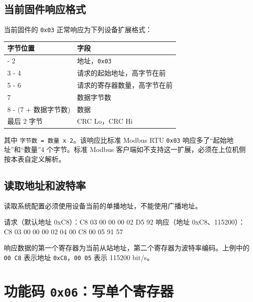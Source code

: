 \documentclass[
  chinese,
]{ctexart}
\newenvironment{Shaded}{}{}
\newcommand{\NormalTok}[1]{#1}
\newcounter{none} %
\begin{document}
\subsection{当前固件响应格式}\label{ux5f53ux524dux56faux4ef6ux54cdux5e94ux683cux5f0f}

当前固件的 \texttt{0x03} 正常响应为下列设备扩展格式：

{\def\LTcaptype{none} %
\begin{longtable}[]{@{}ll@{}}
\toprule\noalign{}
字节位置 & 字段 \\
\midrule\noalign{}
\endhead
\bottomrule\noalign{}
\endlastfoot
1 - 2 & 地址，\texttt{0x03} \\
3 - 4 & 请求的起始地址，高字节在前 \\
5 - 6 & 请求的寄存器数量，高字节在前 \\
7 & 数据字节数 \\
8 - (7 + 数据字节数) & 数据 \\
最后 2 字节 & CRC Lo，CRC Hi \\
\end{longtable}
}

其中 \texttt{字节数\ =\ 数量\ x\ 2}。该响应比标准 Modbus RTU
\texttt{0x03} 响应多了``起始地址''和``数量''4 个字节。标准 Modbus
客户端如不支持这一扩展，必须在上位机侧按本表自定义解析。

\subsection{读取地址和波特率}\label{ux8bfbux53d6ux5730ux5740ux548cux6ce2ux7279ux7387}

读取系统配置必须使用设备当前的单播地址，不能使用广播地址。

\begin{Shaded}
\begin{Highlighting}[]
\NormalTok{请求（默认地址 0xC8）：C8 03 00 00 00 02 D5 92}
\NormalTok{响应（地址 0xC8、115200）：C8 03 00 00 00 02 04 00 C8 00 05 91 57}
\end{Highlighting}
\end{Shaded}

响应数据的第一个寄存器为当前从站地址，第二个寄存器为波特率编码。上例中的
\texttt{00\ C8} 表示地址 \texttt{0xC8}，\texttt{00\ 05} 表示 115200
bit/s。

\section{\texorpdfstring{功能码
\texttt{0x06}：写单个寄存器}{功能码 0x06：写单个寄存器}}\label{ux529fux80fdux7801-0x06ux5199ux5355ux4e2aux5bc4ux5b58ux5668}
\end{document}
